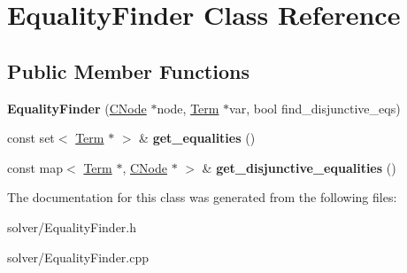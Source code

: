 \hypertarget{classEqualityFinder}{\section{\-Equality\-Finder \-Class \-Reference}
\label{classEqualityFinder}
}
\subsection*{\-Public \-Member \-Functions}
\begin{DoxyCompactItemize}
\item 
\hypertarget{classEqualityFinder_a89494aed5b36818e300f60a280eb7496}{{\bfseries \-Equality\-Finder} (\hyperlink{classCNode}{\-C\-Node} $\ast$node, \hyperlink{classTerm}{\-Term} $\ast$var, bool find\-\_\-disjunctive\-\_\-eqs)}\label{classEqualityFinder_a89494aed5b36818e300f60a280eb7496}

\item 
\hypertarget{classEqualityFinder_a86ada1a0ee04376c9bc778025bc678d5}{const set$<$ \hyperlink{classTerm}{\-Term} $\ast$ $>$ \& {\bfseries get\-\_\-equalities} ()}\label{classEqualityFinder_a86ada1a0ee04376c9bc778025bc678d5}

\item 
\hypertarget{classEqualityFinder_a7f9323eda39ba6fecc3d1ca68d296361}{const map$<$ \hyperlink{classTerm}{\-Term} $\ast$, \hyperlink{classCNode}{\-C\-Node} $\ast$ $>$ \& {\bfseries get\-\_\-disjunctive\-\_\-equalities} ()}\label{classEqualityFinder_a7f9323eda39ba6fecc3d1ca68d296361}

\end{DoxyCompactItemize}


\-The documentation for this class was generated from the following files\-:\begin{DoxyCompactItemize}
\item 
solver/\-Equality\-Finder.\-h\item 
solver/\-Equality\-Finder.\-cpp\end{DoxyCompactItemize}
